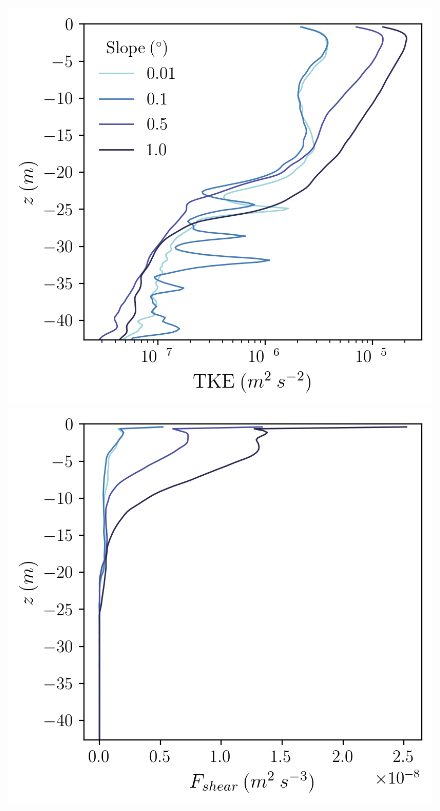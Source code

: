 \documentclass[draft]{styles/agujournal2019}
\begin{document}
\begin{figure}
    \centering
    \begin{minipage}{0.33\textwidth}
        \includegraphics[trim={0 0 0 0},clip, width=\textwidth]{Figures/eres_cmp_dslope_43h_tav13h_z_profile.png}
    \end{minipage}%
    \begin{minipage}{0.33\textwidth}
        \includegraphics[trim={0 0 0 0},clip,width=\textwidth]{Figures/Fshear_cmp_dslope_43h_tav13h_z_profile.png}    

\end{minipage}
\end{figure}
\end{document}
